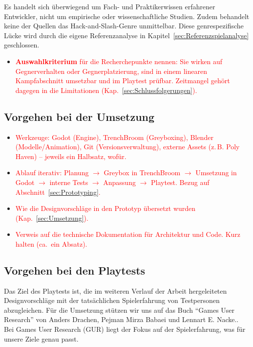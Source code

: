 \documentclass[../Main.tex]{subfiles}
\begin{document}
Es handelt sich überwiegend um Fach- und Praktikerwissen erfahrener Entwickler, nicht um empirische oder wissenschaftliche Studien. Zudem behandelt keine der Quellen das Hack-and-Slash-Genre unmittelbar. Diese genrespezifische Lücke wird durch die eigene Referenzanalyse in Kapitel~\ref{sec:Referenzspielanalyse} geschlossen.

\begin{itemize}[leftmargin=1.5cm]
    \item \textcolor{red}{\textbf{Auswahlkriterium} für die Recherchepunkte nennen: Sie wirken auf Gegnerverhalten oder Gegnerplatzierung, sind in einem linearen Kampfabschnitt umsetzbar und im Playtest prüfbar. Zeitmangel gehört dagegen in die Limitationen (Kap.~\ref{sec:Schlussfolgerungen}).}
\end{itemize}

\subsection{Vorgehen bei der Umsetzung} \label{sec:VorgehenUmsetzung}

\begin{itemize}[leftmargin=1.5cm]
    \item \textcolor{red}{Werkzeuge: Godot (Engine), TrenchBroom (Greyboxing), Blender (Modelle/Animation), Git (Versionsverwaltung), externe Assets (z.\,B. Poly Haven) -- jeweils ein Halbsatz, wofür.}
    \item \textcolor{red}{Ablauf iterativ: Planung $\rightarrow$ Greybox in TrenchBroom $\rightarrow$ Umsetzung in Godot $\rightarrow$ interne Tests $\rightarrow$ Anpassung $\rightarrow$ Playtest. Bezug auf Abschnitt~\ref{sec:Prototyping}.}
    \item \textcolor{red}{Wie die Designvorschläge in den Prototyp übersetzt wurden (Kap.~\ref{sec:Umsetzung}).}
    \item \textcolor{red}{Verweis auf die technische Dokumentation für Architektur und Code. Kurz halten (ca.\ ein Absatz).}
\end{itemize}

\subsection{Vorgehen bei den Playtests} \label{sec:VorgehenPlaytest}
Das Ziel des Playtests ist, die im weiteren Verlauf der Arbeit hergeleiteten Designvorschläge mit der tatsächlichen Spielerfahrung von Testpersonen abzugleichen. Für die Umsetzung stützen wir uns auf das Buch \enquote{Games User Research} von Anders Drachen, Pejman Mirza Babaei und Lennart E. Nacke.\autocite{drachen2018gamesuserresearch}. Bei Games User Research (GUR) liegt der Fokus auf der Spielerfahrung, was für unsere Ziele genau passt.
\end{document}
